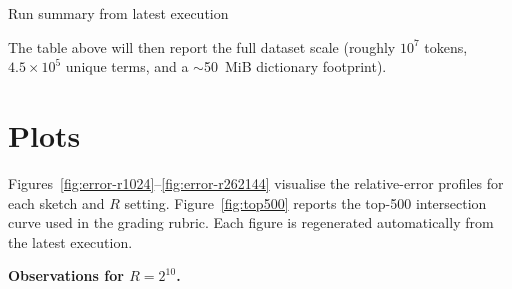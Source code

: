 \documentclass[11pt]{article}
\begin{document}
\begin{table}[H]
  \centering
  \caption{Run summary from latest execution}
  \label{tab:run-summary}
  
\end{table}
The table above will then report the full dataset scale (roughly $10^7$ tokens, $4.5\times 10^5$ unique terms, and a $\sim$50~MiB dictionary footprint).

\section{Plots}
Figures~\ref{fig:error-r1024}--\ref{fig:error-r262144} visualise the relative-error profiles for each sketch and $R$ setting. Figure~\ref{fig:top500} reports the top-500 intersection curve used in the grading rubric. Each figure is regenerated automatically from the latest execution.

\noindent\textbf{Observations for $R=2^{10}$.}
\end{document}
